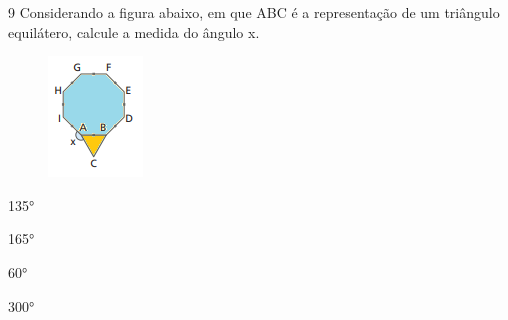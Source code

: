 





\num{9} Considerando a figura abaixo, em que ABC é a representação de um
triângulo equilátero, calcule a medida do ângulo x.
\begin{figure}[H]
\centering\includegraphics[width=0.98958in,height=1.26042in]{./imgSAEB_8_MAT/media/image56.png}
\end{figure}
\item 135°
\item 165°
\item 60°
\item 300°






